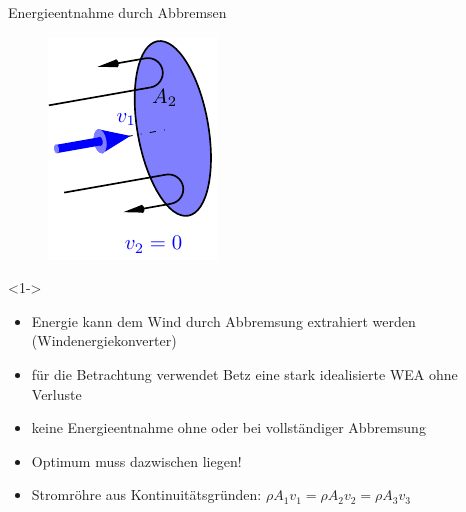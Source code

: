 \begin{frame}{Energieentnahme durch Abbremsen}
\begin{figure}[htbp]
\begin{center}
\begin{minipage}[c]{0.15\linewidth}
			\includegraphics[width=\linewidth]{WEN/streamtube3.pdf}
		\end{minipage}
	\end{center}
\end{figure}
\begin{block}<1->{}
\begin{itemize}
	\item Energie kann dem Wind durch Abbremsung extrahiert werden (Windenergiekonverter)
	\item für die Betrachtung verwendet Betz eine stark idealisierte WEA ohne Verluste %
	\item keine Energieentnahme ohne oder bei vollständiger Abbremsung 
	\item <2-> Optimum muss dazwischen liegen!
	\item <2-> Stromröhre aus Kontinuitätsgründen: $\rho A_1 v_1= \rho A_2 v_2= \rho A_3 v_3$
\end{itemize}
\end{block}	 
\end{frame}

